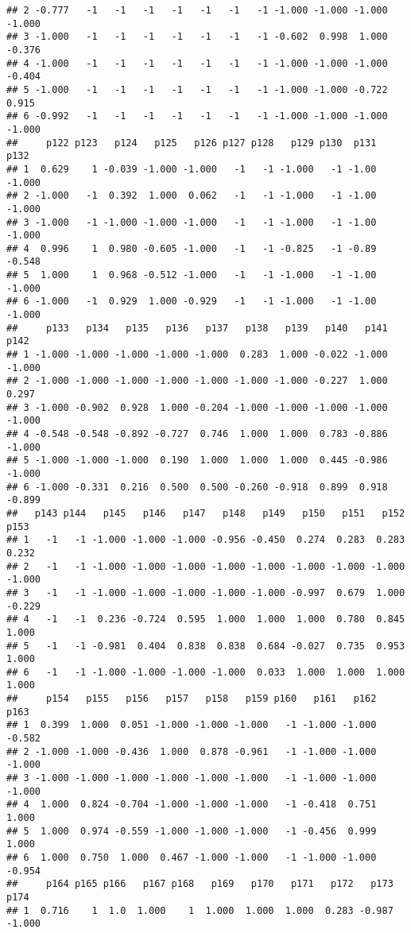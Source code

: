 \documentclass[]{article}
\begin{document}
\begin{verbatim}
## 2 -0.777   -1   -1   -1   -1   -1   -1   -1 -1.000 -1.000 -1.000 -1.000
## 3 -1.000   -1   -1   -1   -1   -1   -1   -1 -0.602  0.998  1.000 -0.376
## 4 -1.000   -1   -1   -1   -1   -1   -1   -1 -1.000 -1.000 -1.000 -0.404
## 5 -1.000   -1   -1   -1   -1   -1   -1   -1 -1.000 -1.000 -0.722  0.915
## 6 -0.992   -1   -1   -1   -1   -1   -1   -1 -1.000 -1.000 -1.000 -1.000
##     p122 p123   p124   p125   p126 p127 p128   p129 p130  p131   p132
## 1  0.629    1 -0.039 -1.000 -1.000   -1   -1 -1.000   -1 -1.00 -1.000
## 2 -1.000   -1  0.392  1.000  0.062   -1   -1 -1.000   -1 -1.00 -1.000
## 3 -1.000   -1 -1.000 -1.000 -1.000   -1   -1 -1.000   -1 -1.00 -1.000
## 4  0.996    1  0.980 -0.605 -1.000   -1   -1 -0.825   -1 -0.89 -0.548
## 5  1.000    1  0.968 -0.512 -1.000   -1   -1 -1.000   -1 -1.00 -1.000
## 6 -1.000   -1  0.929  1.000 -0.929   -1   -1 -1.000   -1 -1.00 -1.000
##     p133   p134   p135   p136   p137   p138   p139   p140   p141   p142
## 1 -1.000 -1.000 -1.000 -1.000 -1.000  0.283  1.000 -0.022 -1.000 -1.000
## 2 -1.000 -1.000 -1.000 -1.000 -1.000 -1.000 -1.000 -0.227  1.000  0.297
## 3 -1.000 -0.902  0.928  1.000 -0.204 -1.000 -1.000 -1.000 -1.000 -1.000
## 4 -0.548 -0.548 -0.892 -0.727  0.746  1.000  1.000  0.783 -0.886 -1.000
## 5 -1.000 -1.000 -1.000  0.190  1.000  1.000  1.000  0.445 -0.986 -1.000
## 6 -1.000 -0.331  0.216  0.500  0.500 -0.260 -0.918  0.899  0.918 -0.899
##   p143 p144   p145   p146   p147   p148   p149   p150   p151   p152   p153
## 1   -1   -1 -1.000 -1.000 -1.000 -0.956 -0.450  0.274  0.283  0.283  0.232
## 2   -1   -1 -1.000 -1.000 -1.000 -1.000 -1.000 -1.000 -1.000 -1.000 -1.000
## 3   -1   -1 -1.000 -1.000 -1.000 -1.000 -1.000 -0.997  0.679  1.000 -0.229
## 4   -1   -1  0.236 -0.724  0.595  1.000  1.000  1.000  0.780  0.845  1.000
## 5   -1   -1 -0.981  0.404  0.838  0.838  0.684 -0.027  0.735  0.953  1.000
## 6   -1   -1 -1.000 -1.000 -1.000 -1.000  0.033  1.000  1.000  1.000  1.000
##     p154   p155   p156   p157   p158   p159 p160   p161   p162   p163
## 1  0.399  1.000  0.051 -1.000 -1.000 -1.000   -1 -1.000 -1.000 -0.582
## 2 -1.000 -1.000 -0.436  1.000  0.878 -0.961   -1 -1.000 -1.000 -1.000
## 3 -1.000 -1.000 -1.000 -1.000 -1.000 -1.000   -1 -1.000 -1.000 -1.000
## 4  1.000  0.824 -0.704 -1.000 -1.000 -1.000   -1 -0.418  0.751  1.000
## 5  1.000  0.974 -0.559 -1.000 -1.000 -1.000   -1 -0.456  0.999  1.000
## 6  1.000  0.750  1.000  0.467 -1.000 -1.000   -1 -1.000 -1.000 -0.954
##     p164 p165 p166   p167 p168   p169   p170   p171   p172   p173   p174
## 1  0.716    1  1.0  1.000    1  1.000  1.000  1.000  0.283 -0.987 -1.000

\end{verbatim}
\end{document}
